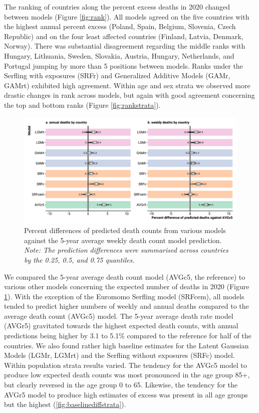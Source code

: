 \documentclass[12pt]{article}
\begin{document}
The ranking of countries along the percent excess deaths in 2020 changed between models (Figure \ref{fig:rank}). All models agreed on the five countries with the highest annual percent excess (Poland, Spain, Belgium, Slovenia, Czech Republic) and on the four least affected countries (Finland, Latvia, Denmark, Norway). There was substantial disagreement regarding the middle ranks with Hungary, Lithuania, Sweden, Slovakia, Austria, Hungary, Netherlands, and Portugal jumping by more than 5 positions between models. Ranks under the Serfling with exposures (SRFr) and Generalized Additive Models (GAMr, GAMrt) exhibited high agreement. Within age and sex strata we observed more drastic changes in rank across models, but again with good agreement concerning the top and bottom ranks (Figure \ref{fig:rankstrata}).


\begin{figure}
  \caption{Percent differences of predicted death counts from various models against the 5-year average weekly death count model prediction. \emph{Note: The prediction differences were summarised across countries by the 0.25, 0.5, and 0.75 quantiles.}}
  \label{fig:baselinediff}
  \includegraphics{baselinediff.pdf}
\end{figure}

We compared the 5-year average death count model (AVGc5, the reference) to various other models concerning the expected number of deaths in 2020 (Figure \ref{fig:baselinediff}). With the exception of the Euromomo Serfling model (SRFcem), all models tended to predict higher numbers of weekly and annual deaths compared to the average death count (AVGc5) model. The 5-year average death rate model (AVGr5) gravitated towards the highest expected death counts, with annual predictions being higher by 3.1 to 5.1\% compared to the reference for half of the countries. We also found rather high baseline estimates for the Latent Gaussian Models (LGMr, LGMrt) and the Serfling without exposures (SRFc) model. Within population strata results varied. The tendency for the AVGc5 model to produce low expected death counts was most pronounced in the age group 85+, but clearly reversed in the age group 0 to 65. Likewise, the tendency for the AVGr5 model to produce high estimates of excess was present in all age groups but the highest (\ref{fig:baselinediffstrata}).
\end{document}
